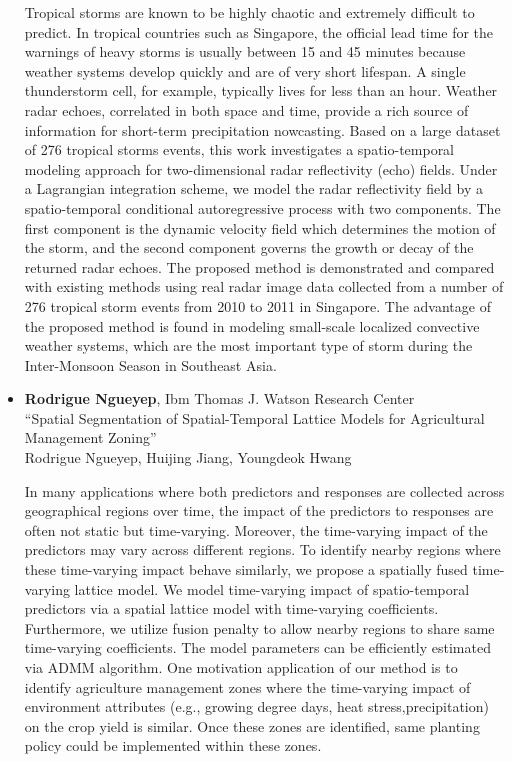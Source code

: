\begin{itemize}
Tropical storms are known to be highly chaotic and extremely difficult to predict. In tropical countries such as Singapore, the official lead time for the warnings of heavy storms is usually between 15 and 45 minutes because weather systems develop quickly and are of very short lifespan. A single thunderstorm cell, for example, typically lives for less than an hour. Weather radar echoes, correlated in both space and time, provide a rich source of information for short-term precipitation nowcasting. Based on a large dataset of 276 tropical storms events, this work investigates a spatio-temporal modeling approach for two-dimensional radar reflectivity (echo) fields. Under a Lagrangian integration scheme, we model the radar reflectivity field by a spatio-temporal conditional autoregressive process with two components. The first component is the dynamic velocity field which determines the motion of the storm, and the second component governs the growth or decay of the returned radar echoes. The proposed method is demonstrated and compared with existing methods using real radar image data collected from a number of 276 tropical storm events from 2010 to 2011 in Singapore. The advantage of the proposed method is found in modeling small-scale localized convective weather systems, which are the most important type of storm during the Inter-Monsoon Season in Southeast Asia.

\item \textbf{Rodrigue Ngueyep}, Ibm Thomas J. Watson Research Center \\
``Spatial Segmentation of Spatial-Temporal Lattice Models for Agricultural Management Zoning'' \\
Rodrigue Ngueyep, Huijing Jiang, Youngdeok Hwang


In many applications where both predictors and responses are collected across geographical regions over time, the impact of the predictors to responses are often not static but time-varying. Moreover, the time-varying impact of the predictors may vary across different regions. To identify nearby regions where these time-varying impact behave similarly, we propose a spatially fused time-varying lattice model. We model time-varying impact of spatio-temporal predictors via a spatial lattice model with time-varying coefficients. Furthermore, we utilize fusion penalty to allow nearby regions to share same time-varying coefficients. The model parameters can be efficiently estimated via ADMM algorithm. One motivation application of our method is to identify agriculture management zones where the time-varying impact of environment attributes (e.g., growing degree days, heat stress,precipitation) on the crop yield is similar. Once these zones are identified, same planting policy could be implemented within these zones.

\end{itemize}

